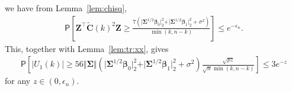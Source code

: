 \documentclass[11pt, a4paper]{article}
\newcommand{\mbf}{\mathbf}
\newcommand{\eps}{\epsilon}
\renewcommand{\l}{\left}
\renewcommand{\r}{\right}
\def\wt{\widetilde}
\newcommand{\p}{\mathsf{P}}
\theoremstyle{definition}
\theoremstyle{definition}
\theoremstyle{definition}
\theoremstyle{definition}
\theoremstyle{definition}
\theoremstyle{remark}
\theoremstyle{definition}
\theoremstyle{definition}
\theoremstyle{definition}
\begin{document}
we have from Lemma~\ref{lem:chisq},
\begin{align*}
\p\l[  \mbf Z^\top \wt{\mbf C}(k)^2 \mbf Z  \ge \frac{7 (\vert \bm\Sigma^{1/2} \bm\beta_0 \vert_2^2 + \vert \bm\Sigma^{1/2} \bm\beta_1 \vert_2^2 + \sigma^2)}{\min(k, n - k)}
\r] \le e^{-\eps_n}.
\end{align*}
This, together with Lemma~\ref{lem:tr:xx}, gives
\begin{align*}
\p\l[ \vert U_1(k) \vert \ge 56 \Vert \bm\Sigma \Vert (\vert \bm\Sigma^{1/2} \bm\beta_0 \vert_2^2 + \vert \bm\Sigma^{1/2} \bm\beta_1 \vert_2^2 + \sigma^2) \frac{\sqrt{pz}}{\sqrt{n} \min(k, n - k)} \r] \le 3e^{-z}
\end{align*}
for any $z \in (0, \eps_n)$.
\end{document}

